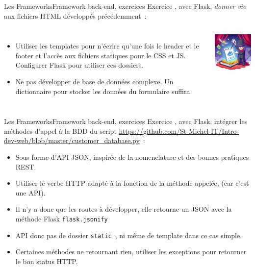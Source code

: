 \documentclass{beamer}
\begin{document}
    \begin{frame}{Les Frameworks}{Framework back-end, exercices}
        Exercice \execcounterdispinc{}, avec Flask, \textit{donner vie} aux fichiers HTML développés précédemment~:
        \bigbreak
        \begin{columns}
            \begin{itemize}
                \item Utiliser les templates pour n'écrire qu'une fois le header et le footer et l'accès aux fichiers statiques pour le CSS et JS.
                Configurer Flask pour utiliser ces dossiers.
                \item Ne pas développer de base de données complexe.
                Un dictionnaire pour stocker les données du formulaire suffira.
            \end{itemize}
            \centering
            \includegraphics[width=5cm]{image/html-alive}
        \end{columns}
    \end{frame}

    \begin{frame}{Les Frameworks}{Framework back-end, exercices}
        Exercice \execcounterdispinc{}, avec Flask, intégrer les méthodes d'appel à la BDD du script \url{https://github.com/St-Michel-IT/Intro-dev-web/blob/master/customer_database.py}~:
        \begin{itemize}
            \item Sous forme d'API JSON, inspirée de la nomenclature et des bonnes pratiques REST.
            \item Utiliser le verbe HTTP adapté à la fonction de la méthode appelée, (car c'est une API).
            \item Il n'y a donc que les routes à développer, elle retourne un JSON avec la méthode Flask \lstinline{flask.jsonify}
            \item API donc pas de dossier \lstinline{static}~, ni même de template dans ce cas simple.
            \item Certaines méthodes ne retournant rien, utiliser les exceptions pour retourner le bon status HTTP.
        \end{itemize}
    \end{frame}
\end{document}
